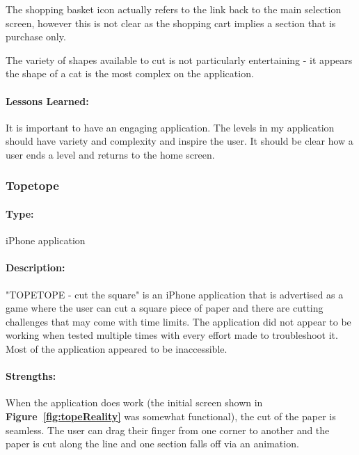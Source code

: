 \documentclass[11pt]{article}
\begin{document}
                The shopping basket icon actually refers to the link back to the main selection screen, however this is not clear as the shopping cart implies a section that is purchase only. 
                
                The variety of shapes available to cut is not particularly entertaining - it appears the shape of a cat is the most complex on the application.
                
                \paragraph{Lessons Learned:}
                
                It is important to have an engaging application. The levels in my application should have variety and complexity and inspire the user. It should be clear how a user ends a level and returns to the home screen.
                
                \subsubsection{Topetope}
                 
                \paragraph{Type:} iPhone application %

                \paragraph{Description:}
                "TOPETOPE - cut the square" is an iPhone application that is advertised as a game where the user can cut a square piece of paper and there are cutting challenges that may come with time limits. The application did not appear to be working when tested multiple times with every effort made to troubleshoot it. Most of the application appeared to be inaccessible. 
                
                \paragraph{Strengths:}
                When the application does work (the initial screen shown in \textbf{Figure~\ref{fig:topeReality}} was somewhat functional), the cut of the paper is seamless. The user can drag their finger from one corner to another and the paper is cut along the line and one section falls off via an animation.
                
\end{document}
